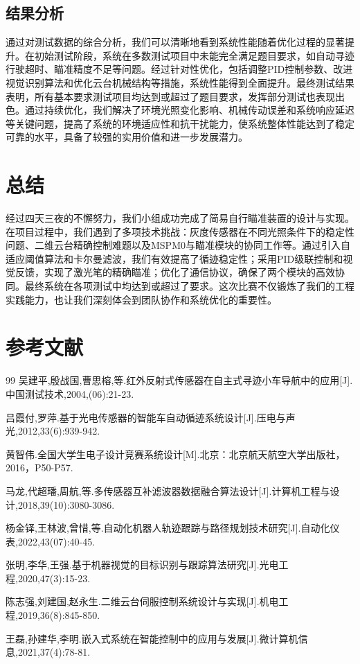 \documentclass[12pt,a4paper]{ctexart}
\begin{document}
\subsection{\textbf{结果分析}}
通过对测试数据的综合分析，我们可以清晰地看到系统性能随着优化过程的显著提升。在初始测试阶段，系统在多数测试项目中未能完全满足题目要求，如自动寻迹行驶超时、瞄准精度不足等问题。经过针对性优化，包括调整PID控制参数、改进视觉识别算法和优化云台机械结构等措施，系统性能得到全面提升。最终测试结果表明，所有基本要求测试项目均达到或超过了题目要求，发挥部分测试也表现出色。通过持续优化，我们解决了环境光照变化影响、机械传动误差和系统响应延迟等关键问题，提高了系统的环境适应性和抗干扰能力，使系统整体性能达到了稳定可靠的水平，具备了较强的实用价值和进一步发展潜力。

\section{\textbf{总结}}

经过四天三夜的不懈努力，我们小组成功完成了简易自行瞄准装置的设计与实现。在项目过程中，我们遇到了多项技术挑战：灰度传感器在不同光照条件下的稳定性问题、二维云台精确控制难题以及MSPM0与瞄准模块的协同工作等。通过引入自适应阈值算法和卡尔曼滤波，我们有效提高了循迹稳定性；采用PID级联控制和视觉反馈，实现了激光笔的精确瞄准；优化了通信协议，确保了两个模块的高效协同。最终系统在各项测试中均达到或超过了要求。这次比赛不仅锻炼了我们的工程实践能力，也让我们深刻体会到团队协作和系统优化的重要性。

\section{\textbf{参考文献}}
\renewcommand{\refname}{}
\vspace{-25pt}
{
\begin{thebibliography}{99}
     吴建平,殷战国,曹思榕,等.红外反射式传感器在自主式寻迹小车导航中的应用[J].中国测试技术,2004,(06):21-23.
    
     吕霞付,罗萍.基于光电传感器的智能车自动循迹系统设计[J].压电与声光,2012,33(6):939-942.
    
     黄智伟.全国大学生电子设计竞赛系统设计[M].北京：北京航天航空大学出版社，2016，P50-P57.
    
     马龙,代超璠,周航,等.多传感器互补滤波器数据融合算法设计[J].计算机工程与设计,2018,39(10):3080-3086.
    
     杨金铎,王林波,曾惜,等.自动化机器人轨迹跟踪与路径规划技术研究[J].自动化仪表,2022,43(07):40-45.

     张明,李华,王强.基于机器视觉的目标识别与跟踪算法研究[J].光电工程,2020,47(3):15-23.
    
     陈志强,刘建国,赵永生.二维云台伺服控制系统设计与实现[J].机电工程,2019,36(8):845-850.
    
     王磊,孙建华,李明.嵌入式系统在智能控制中的应用与发展[J].微计算机信息,2021,37(4):78-81.    
\end{thebibliography}
}
\end{document}
